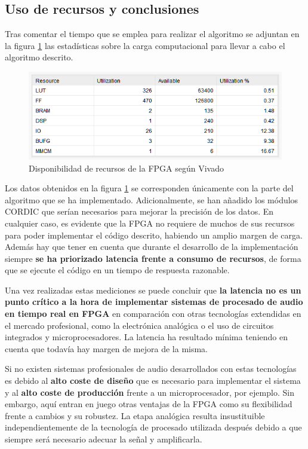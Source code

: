 \subsection{Uso de recursos y conclusiones}

Tras comentar el tiempo que se emplea para realizar el algoritmo se adjuntan en la figura \ref{fig:estarea} las estadísticas sobre la carga computacional para llevar a cabo el algoritmo descrito. 

\begin{figure}[!bht]
\begin{center}
\includegraphics[width=15cm]{img/areafpga.png}
\caption{\label{fig:estarea}Disponibilidad de recursos de la FPGA según Vivado}
\end{center}
\end{figure}

Los datos obtenidos en la figura \ref{fig:estarea} se corresponden únicamente con la parte del algoritmo que se ha implementado. Adicionalmente, se han añadido los módulos CORDIC que serían necesarios para mejorar la precisión de los datos. En cualquier caso, es evidente que la FPGA no requiere de muchos de sus recursos para poder implementar el código descrito, habiendo un amplio margen de carga. Además hay que tener en cuenta que durante el desarrollo de la implementación siempre \textbf{se ha priorizado latencia frente a consumo de recursos}, de forma que se ejecute el código en un tiempo de respuesta razonable.

Una vez realizadas estas mediciones se puede concluir que \textbf{la latencia no es un punto crítico a la hora de implementar sistemas de procesado de audio en tiempo real en FPGA} en comparación con otras tecnologías extendidas en el mercado profesional, como la electrónica analógica o el uso de circuitos integrados y microprocesadores. La latencia ha resultado mínima teniendo en cuenta que todavía hay margen de mejora de la misma. 

Si no existen sistemas profesionales de audio desarrollados con estas tecnologías es debido al \textbf{alto coste de diseño} que es necesario para implementar el sistema y al \textbf{alto coste de producción} frente a un microprocesador, por ejemplo. Sin embargo, aquí entran en juego otras ventajas de la FPGA como su flexibilidad frente a cambios y su robustez. La etapa analógica resulta insustituible independientemente de la tecnología de procesado utilizada después debido a que siempre será necesario adecuar la señal y amplificarla.